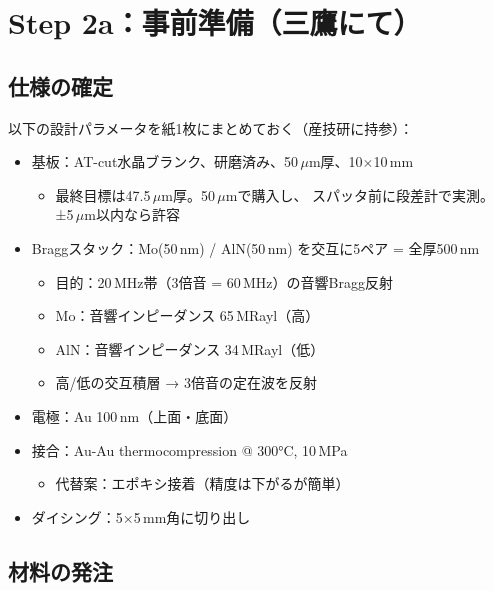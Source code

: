 \documentclass[11pt,a4paper]{article}
\def\textbf#1{#1}%
\begin{document}
\section{Step 2a：事前準備（三鷹にて）}

\subsection{仕様の確定}

以下の設計パラメータを紙1枚にまとめておく（産技研に持参）：

\begin{tcolorbox}[colback=yellow!5,colframe=yellow!60!black,title=設計仕様書（持参用）]
\begin{itemize}[leftmargin=*]
\item \textbf{基板}：AT-cut水晶ブランク、研磨済み、50\,$\mu$m厚、10$\times$10\,mm
  \begin{itemize}
  \item 最終目標は47.5\,$\mu$m厚。50\,$\mu$mで購入し、
    スパッタ前に段差計で実測。±5\,$\mu$m以内なら許容
  \end{itemize}
\item \textbf{Braggスタック}：Mo(50\,nm) / AlN(50\,nm) を交互に5ペア = 全厚500\,nm
  \begin{itemize}
  \item 目的：20\,MHz帯（3倍音 = 60\,MHz）の音響Bragg反射
  \item Mo：音響インピーダンス 65\,MRayl（高）
  \item AlN：音響インピーダンス 34\,MRayl（低）
  \item 高/低の交互積層 → 3倍音の定在波を反射
  \end{itemize}
\item \textbf{電極}：Au 100\,nm（上面・底面）
\item \textbf{接合}：Au-Au thermocompression @ 300°C, 10\,MPa
  \begin{itemize}
  \item 代替案：エポキシ接着（精度は下がるが簡単）
  \end{itemize}
\item \textbf{ダイシング}：5$\times$5\,mm角に切り出し
\end{itemize}
\end{tcolorbox}

\subsection{材料の発注}
\end{document}
